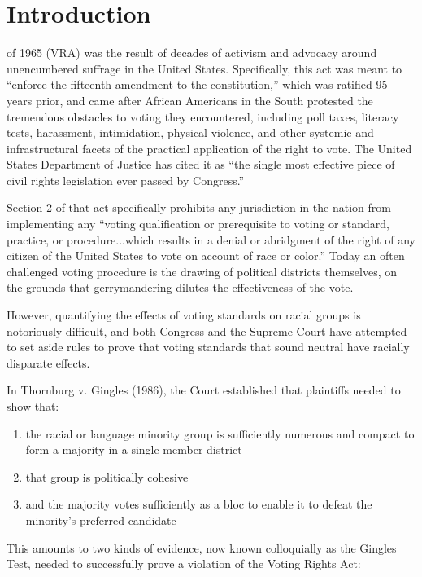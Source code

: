 \chapter{Introduction}
\label{introduction}

 of 1965 (VRA)\cite{vra} was the result of decades of activism and advocacy around unencumbered suffrage in the United States. Specifically, this act was meant to “enforce the fifteenth amendment to the constitution,” which was ratified 95 years prior, and came after African Americans in the South protested the tremendous obstacles to voting they encountered, including poll taxes, literacy tests, harassment, intimidation, physical violence, and other systemic and infrastructural facets of the practical application of the right to vote. The United States Department of Justice has cited it as “the single most effective piece of civil rights legislation ever passed by Congress.”\cite{effective}

Section 2 of that act specifically prohibits any jurisdiction in the nation from implementing any “voting qualification or prerequisite to voting or standard, practice, or procedure...which results in a denial or abridgment of the right of any citizen of the United States to vote on account of race or color.” Today an often challenged voting procedure is the drawing of political districts themselves, on the grounds that gerrymandering dilutes the effectiveness of the vote.

However, quantifying the effects of voting standards on racial groups is notoriously difficult, and both Congress and the Supreme Court have attempted to set aside rules to prove that voting standards that sound neutral have racially disparate effects.

In Thornburg v. Gingles (1986)\cite{thornburg}, the Court established that plaintiffs needed to show that:

\begin{enumerate}
 \item the racial or language minority group is sufficiently numerous and compact to form a majority in a single-member district
 \item that group is politically cohesive
 \item and the majority votes sufficiently as a bloc to enable it to defeat the minority’s preferred candidate
\end{enumerate}

This amounts to two kinds of evidence, now known colloquially as the Gingles Test, needed to successfully prove a violation of the Voting Rights Act:

